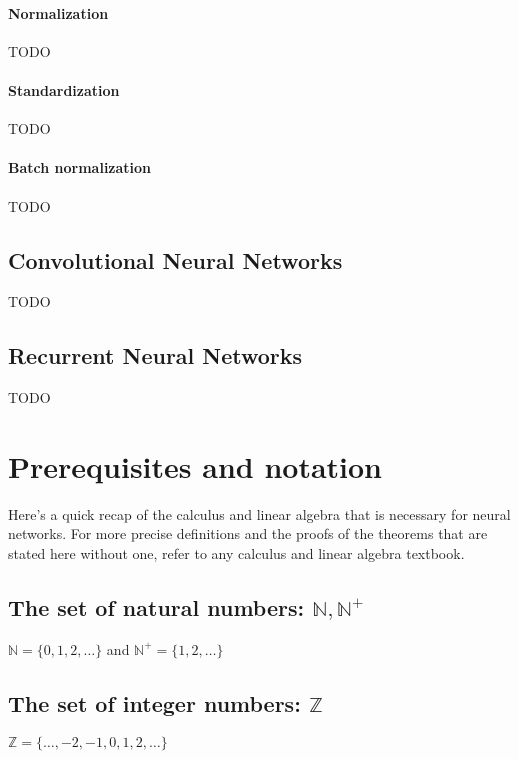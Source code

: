 \documentclass[titlepage]{article}
\begin{document}
        \paragraph{Normalization}

          TODO

        \paragraph{Standardization}

          TODO

        \paragraph{Batch normalization}

          TODO

\newpage

    \subsection{Convolutional Neural Networks}

      TODO

\newpage

    \subsection{Recurrent Neural Networks}

      TODO

\newpage

  \appendix

    \section{Prerequisites and notation}

      Here's a quick recap of the calculus and linear algebra that is necessary
      for neural networks. For more precise definitions and the proofs of the
      theorems that are stated here without one, refer to any calculus and
      linear algebra textbook.

      \subsection{The set of natural numbers: $\mathbb{N}, \mathbb{N}^+$}
        $\mathbb{N} = \{ 0, 1, 2, \ldots \}$ and
        $\mathbb{N}^+ = \{ 1, 2, \ldots \}$

      \subsection{The set of integer numbers: $\mathbb{Z}$}
        $\mathbb{Z} = \{ \ldots, -2, -1, 0, 1, 2, \ldots \}$
\end{document}
